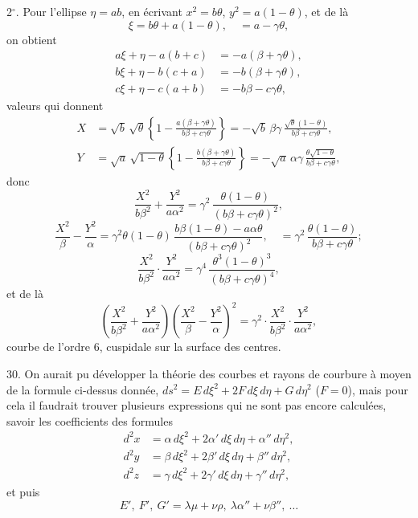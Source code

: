 \documentclass[11pt,a4paper]{book}
\begin{document}
{{{2$^\circ$. Pour l'ellipse $\eta = ab$, en \'ecrivant $x^2 = b\theta$, $y^2 = a(1-\theta)$, et de l\`a
\[
\xi = b\theta + a(1-\theta), \quad = a - \gamma\theta,
\]
on obtient
\begin{align*}
a\xi + \eta - a(b+c) &= -a(\beta + \gamma\theta), \\
b\xi + \eta - b(c+a) &= -b(\beta + \gamma\theta), \\
c\xi + \eta - c(a+b) &= -b\beta - c\gamma\theta,
\end{align*}
valeurs qui donnent
\begin{align*}
X &= \sqrt{b}\,\sqrt{\theta}\left\{1 - \frac{a(\beta+\gamma\theta)}{b\beta+c\gamma\theta}\right\}
= -\sqrt{b}\,\beta\gamma\,\frac{\sqrt{\theta}(1-\theta)}{b\beta+c\gamma\theta},\\
Y &= \sqrt{a}\,\sqrt{1-\theta}\left\{1 - \frac{b(\beta+\gamma\theta)}{b\beta+c\gamma\theta}\right\}
= -\sqrt{a}\,\alpha\gamma\,\frac{\theta\sqrt{1-\theta}}{b\beta+c\gamma\theta},
\end{align*}
donc
\[
\frac{X^2}{b\beta^2} + \frac{Y^2}{a\alpha^2}
= \gamma^2\,\frac{\theta(1-\theta)}{(b\beta+c\gamma\theta)^2},
\]
\[
\frac{X^2}{\beta} - \frac{Y^2}{\alpha}
= \gamma^2\theta(1-\theta)\,\frac{b\beta(1-\theta)-a\alpha\theta}{(b\beta+c\gamma\theta)^2},
\quad = \gamma^2\,\frac{\theta(1-\theta)}{b\beta+c\gamma\theta};
\]
\[
\frac{X^2}{b\beta^2}\cdot\frac{Y^2}{a\alpha^2}
= \gamma^4\,\frac{\theta^3(1-\theta)^3}{(b\beta+c\gamma\theta)^4},
\]
et de l\`a
\[
\left(\frac{X^2}{b\beta^2} + \frac{Y^2}{a\alpha^2}\right)
\left(\frac{X^2}{\beta} - \frac{Y^2}{\alpha}\right)^2
= \gamma^2\cdot\frac{X^2}{b\beta^2}\cdot\frac{Y^2}{a\alpha^2},
\]
courbe de l'ordre 6, cuspidale sur la surface des centres.

30. On aurait pu d\'evelopper la th\'eorie des courbes et rayons de courbure \`a
moyen de la formule ci-dessus donn\'ee,
$ds^2 = E\,d\xi^2 + 2F\,d\xi\,d\eta + G\,d\eta^2$ ($F=0$),
mais pour cela il faudrait trouver plusieurs expressions qui ne sont pas encore
calcul\'ees, savoir les coefficients des formules
\begin{align*}
d^2x &= \alpha\,d\xi^2 + 2\alpha'\,d\xi\,d\eta + \alpha''\,d\eta^2,\\
d^2y &= \beta\,d\xi^2 + 2\beta'\,d\xi\,d\eta + \beta''\,d\eta^2,\\
d^2z &= \gamma\,d\xi^2 + 2\gamma'\,d\xi\,d\eta + \gamma''\,d\eta^2,
\end{align*}
et puis
\[
E',\ F',\ G' = \lambda\mu + \nu\rho,\ \lambda\alpha'' + \nu\beta'',\ \ldots
\]

}}}
\end{document}
